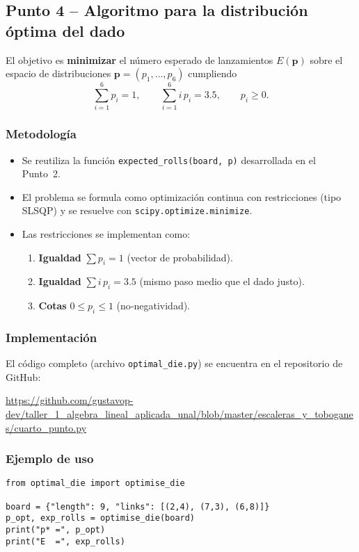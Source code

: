 \subsection{Punto 4 – Algoritmo para la distribución óptima del dado}

El objetivo es \textbf{minimizar} el número esperado de lanzamientos
$E(\mathbf{p})$ sobre el espacio de distribuciones
$\mathbf{p} = (p_1,\dots,p_6)$ cumpliendo
\[
\sum_{i=1}^6 p_i = 1,
\qquad
\sum_{i=1}^6 i\,p_i = 3.5,
\qquad
p_i \ge 0.
\]

\subsubsection{Metodología}
\begin{itemize}
  \item Se reutiliza la función \verb|expected_rolls(board, p)| desarrollada en el Punto~2.
  \item El problema se formula como optimización continua con restricciones
        (tipo SLSQP) y se resuelve con \texttt{scipy.optimize.minimize}.
  \item Las restricciones se implementan como:
        \begin{enumerate}
          \item \textbf{Igualdad} $\sum p_i = 1$ (vector de probabilidad).
          \item \textbf{Igualdad} $\sum i\,p_i = 3.5$ (mismo paso medio que el dado justo).
          \item \textbf{Cotas} $0 \le p_i \le 1$ (no‐negatividad).
        \end{enumerate}
\end{itemize}

\subsubsection{Implementación}
El código completo (archivo \texttt{optimal\_die.py}) se encuentra en el
repositorio de GitHub:

\begin{center}
\url{https://github.com/gustavop-dev/taller_1_algebra_lineal_aplicada_unal/blob/master/escaleras_y_toboganes/cuarto_punto.py}
\end{center}

\subsubsection{Ejemplo de uso}
\begin{verbatim}
from optimal_die import optimise_die

board = {"length": 9, "links": [(2,4), (7,3), (6,8)]}
p_opt, exp_rolls = optimise_die(board)
print("p* =", p_opt)
print("E  =", exp_rolls)
\end{verbatim}

